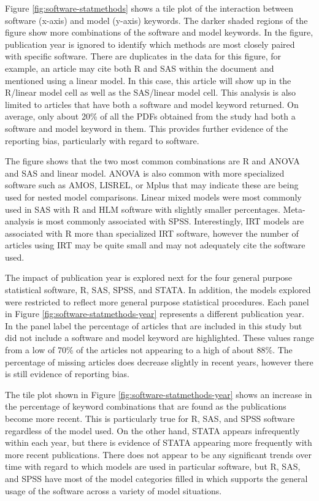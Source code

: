 \documentclass[english,,man]{apa6}
\theoremstyle{definition}
\theoremstyle{definition}
\theoremstyle{definition}
\theoremstyle{remark}
\begin{document}
Figure \ref{fig:software-statmethods} shows a tile plot of the
interaction between software (x-axis) and model (y-axis) keywords. The
darker shaded regions of the figure show more combinations of the
software and model keywords. In the figure, publication year is ignored
to identify which methods are most closely paired with specific
software. There are duplicates in the data for this figure, for example,
an article may cite both R and SAS within the document and mentioned
using a linear model. In this case, this article will show up in the
R/linear model cell as well as the SAS/linear model cell. This analysis
is also limited to articles that have both a software and model keyword
returned. On average, only about 20\% of all the PDFs obtained from the
study had both a software and model keyword in them. This provides
further evidence of the reporting bias, particularly with regard to
software.

The figure shows that the two most common combinations are R and ANOVA
and SAS and linear model. ANOVA is also common with more specialized
software such as AMOS, LISREL, or Mplus that may indicate these are
being used for nested model comparisons. Linear mixed models were most
commonly used in SAS with R and HLM software with slightly smaller
percentages. Meta-analysis is most commonly associated with SPSS.
Interestingly, IRT models are associated with R more than specialized
IRT software, however the number of articles using IRT may be quite
small and may not adequately cite the software used.

The impact of publication year is explored next for the four general
purpose statistical software, R, SAS, SPSS, and STATA. In addition, the
models explored were restricted to reflect more general purpose
statistical procedures. Each panel in Figure
\ref{fig:software-statmethods-year} represents a different publication
year. In the panel label the percentage of articles that are included in
this study but did not include a software and model keyword are
highlighted. These values range from a low of 70\% of the articles not
appearing to a high of about 88\%. The percentage of missing articles
does decrease slightly in recent years, however there is still evidence
of reporting bias.

The tile plot shown in Figure \ref{fig:software-statmethods-year} shows
an increase in the percentage of keyword combinations that are found as
the publications become more recent. This is particularly true for R,
SAS, and SPSS software regardless of the model used. On the other hand,
STATA appears infrequently within each year, but there is evidence of
STATA appearing more frequently with more recent publications. There
does not appear to be any significant trends over time with regard to
which models are used in particular software, but R, SAS, and SPSS have
most of the model categories filled in which supports the general usage
of the software across a variety of model situations.
\end{document}
